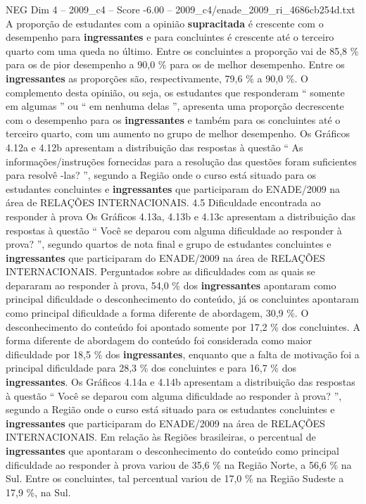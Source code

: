 \begin{textsample}{NEG Dim 4 – 2009\_c4 – Score -6.00 – 2009\_c4/enade\_2009\_ri\_4686cb254d.txt}
A proporção de estudantes com a opinião \textbf{supracitada} é crescente com o desempenho para \textbf{ingressantes} e para concluintes é crescente até o terceiro quarto com uma queda no último.
Entre os concluintes a proporção vai de 85,8 \% para os de pior desempenho a 90,0 \% para os de melhor desempenho.
Entre os \textbf{ingressantes} as proporções são, respectivamente, 79,6 \% a 90,0 \%.
O complemento desta opinião, ou seja, os estudantes que responderam “ somente em algumas ” ou “ em nenhuma delas ”, apresenta uma proporção decrescente com o desempenho para os \textbf{ingressantes} e também para os concluintes até o terceiro quarto, com um aumento no grupo de melhor desempenho.
Os Gráficos 4.12a e 4.12b apresentam a distribuição das respostas à questão “ As informações/instruções fornecidas para a resolução das questões foram suficientes para resolvê -las? ”, segundo a Região onde o curso está situado para os estudantes concluintes e \textbf{ingressantes} que participaram do ENADE/2009 na área de RELAÇÕES INTERNACIONAIS. 4.5 Dificuldade encontrada ao responder à prova Os Gráficos 4.13a, 4.13b e 4.13c apresentam a distribuição das respostas à questão “ Você se deparou com alguma dificuldade ao responder à prova? ”, segundo quartos de nota final e grupo de estudantes concluintes e \textbf{ingressantes} que participaram do ENADE/2009 na área de RELAÇÕES INTERNACIONAIS.
Perguntados sobre as dificuldades com as quais se depararam ao responder à prova, 54,0 \% dos \textbf{ingressantes} apontaram como principal dificuldade o desconhecimento do conteúdo, já os concluintes apontaram como principal dificuldade a forma diferente de abordagem, 30,9 \%.
O desconhecimento do conteúdo foi apontado somente por 17,2 \% dos concluintes.
A forma diferente de abordagem do conteúdo foi considerada como maior dificuldade por 18,5 \% dos \textbf{ingressantes}, enquanto que a falta de motivação foi a principal dificuldade para 28,3 \% dos concluintes e para 16,7 \% dos \textbf{ingressantes}.
Os Gráficos 4.14a e 4.14b apresentam a distribuição das respostas à questão “ Você se deparou com alguma dificuldade ao responder à prova? ”, segundo a Região onde o curso está situado para os estudantes concluintes e \textbf{ingressantes} que participaram do ENADE/2009 na área de RELAÇÕES INTERNACIONAIS.
Em relação às Regiões brasileiras, o percentual de \textbf{ingressantes} que apontaram o desconhecimento do conteúdo como principal dificuldade ao responder à prova variou de 35,6 \% na Região Norte, a 56,6 \% na Sul.
Entre os concluintes, tal percentual variou de 17,0 \% na Região Sudeste a 17,9 \%, na Sul.

\end{textsample}
